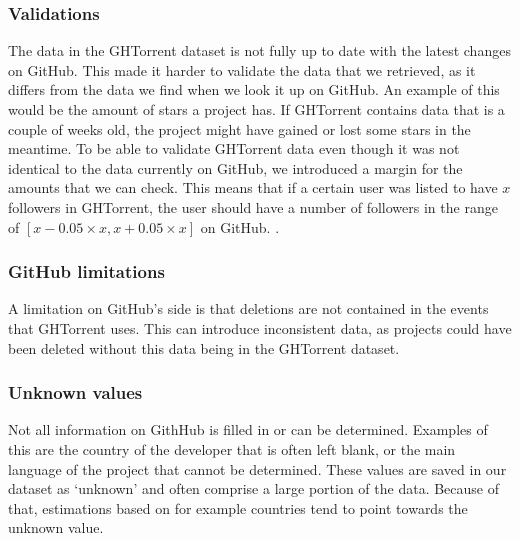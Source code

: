 \subsubsection{Validations}
The data in the GHTorrent dataset is not fully up to date with the latest changes on GitHub.
This made it harder to validate the data that we retrieved, as it differs from the data we find when we look it up on GitHub.
An example of this would be the amount of stars a project has.
If GHTorrent contains data that is a couple of weeks old, the project might have gained or lost some stars in the meantime.
To be able to validate GHTorrent data even though it was not identical to the data currently on GitHub, we introduced a margin for the amounts that we can check.
This means that if a certain user was listed to have $x$ followers in GHTorrent, the user should have a number of  followers in the range of $[x - 0.05 \times x , x + 0.05 \times x]$ on GitHub.
. \\

\subsubsection{GitHub limitations}
A limitation on GitHub's side is that deletions are not contained in the events that GHTorrent uses.\cite{gousios-2013}
This can introduce inconsistent data, as projects could have been deleted without this data being in the GHTorrent dataset.\\

\subsubsection{Unknown values}
Not all information on GithHub is filled in or can be determined.
Examples of this are the country of the developer that is often left blank, or the main language of the project that cannot be determined.
These values are saved in our dataset as `unknown' and often comprise a large portion of the data.
Because of that, estimations based on for example countries tend to point towards the unknown value.
